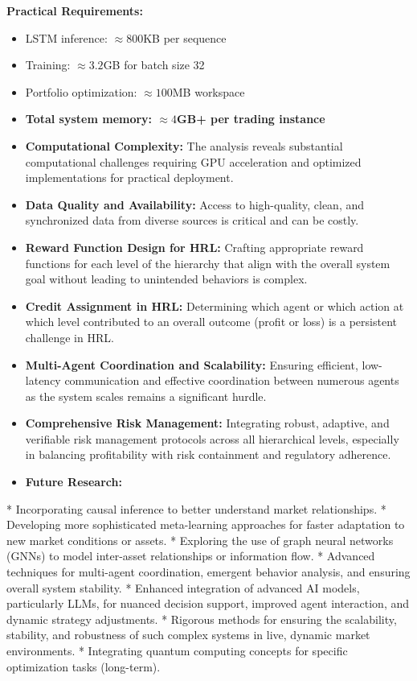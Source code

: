 \documentclass[11pt,a4paper]{article}
\begin{document}
\textbf{Practical Requirements:}
\begin{itemize}
\item LSTM inference: $\approx 800$KB per sequence
\item Training: $\approx 3.2$GB for batch size 32
\item Portfolio optimization: $\approx 100$MB workspace
\item \textbf{Total system memory: $\approx 4$GB+ per trading instance}

\item   \textbf{Computational Complexity:} The analysis reveals substantial computational challenges requiring GPU acceleration and optimized implementations for practical deployment.
\item   \textbf{Data Quality and Availability:} Access to high-quality, clean, and synchronized data from diverse sources is critical and can be costly.
\item   \textbf{Reward Function Design for HRL:} Crafting appropriate reward functions for each level of the hierarchy that align with the overall system goal without leading to unintended behaviors is complex.
\item   \textbf{Credit Assignment in HRL:} Determining which agent or which action at which level contributed to an overall outcome (profit or loss) is a persistent challenge in HRL.
\item   \textbf{Multi-Agent Coordination and Scalability:} Ensuring efficient, low-latency communication and effective coordination between numerous agents as the system scales remains a significant hurdle.
\item   \textbf{Comprehensive Risk Management:} Integrating robust, adaptive, and verifiable risk management protocols across all hierarchical levels, especially in balancing profitability with risk containment and regulatory adherence.
\item   \textbf{Future Research:}
\end{itemize}
    *   Incorporating causal inference to better understand market relationships.
    *   Developing more sophisticated meta-learning approaches for faster adaptation to new market conditions or assets.
    *   Exploring the use of graph neural networks (GNNs) to model inter-asset relationships or information flow.
    *   Advanced techniques for multi-agent coordination, emergent behavior analysis, and ensuring overall system stability.
    *   Enhanced integration of advanced AI models, particularly LLMs, for nuanced decision support, improved agent interaction, and dynamic strategy adjustments.
    *   Rigorous methods for ensuring the scalability, stability, and robustness of such complex systems in live, dynamic market environments.
    *   Integrating quantum computing concepts for specific optimization tasks (long-term).
\end{document}
